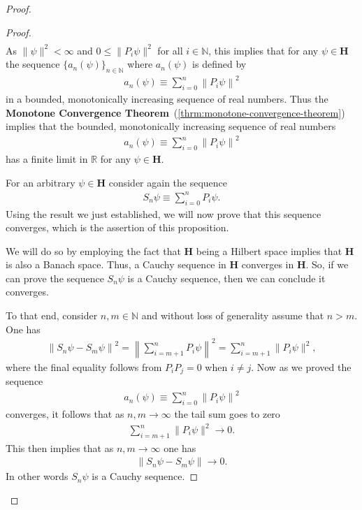 \begin{proof}
\begin{proof}
\begin{align}
\end{align}
As $\|\psi\|^2 < \infty$ and $0 \le \|P_i\psi\|^2$ for all $i \in \mathbb{N}$, this implies that for any $\psi \in \mathbf{H}$ the sequence $\{ a_n(\psi) \}_{n \in \mathbb{N}}$ where $a_n(\psi)$ is defined by
\begin{align}
    a_n(\psi) \equiv \sum_{i = 0}^n \left\| P_i\psi \right\|^2
\end{align}
in a bounded, monotonically increasing sequence of real numbers. Thus the \textbf{Monotone Convergence Theorem}~(\ref{thrm:monotone-convergence-theorem}) implies that the bounded, monotonically increasing sequence of real numbers
\begin{align}
    a_n(\psi) \equiv \sum_{i = 0}^n \left\| P_i\psi \right\|^2
\end{align}
has a finite limit in $\mathbb{R}$ for any $\psi \in \mathbf{H}$.

For an arbitrary $\psi \in \mathbf{H}$ consider again the sequence 
\begin{align}
    S_n\psi \equiv \sum_{i = 0}^n P_i\psi.
\end{align}
Using the result we just established, we will now prove that this sequence converges, which is the assertion of this proposition.

We will do so by employing the fact that $\mathbf{H}$ being a Hilbert space implies that $\mathbf{H}$ is also a Banach space. Thus, a Cauchy sequence in $\mathbf{H}$ converges in $\mathbf{H}$. So, if we can prove the sequence $S_n\psi$ is a Cauchy sequence, then we can conclude it converges.

To that end, consider $n, m \in \mathbb{N}$ and without loss of generality assume that $n > m$. One has
\begin{align}
    \left\| S_n\psi - S_m \psi \right\|^2 = \left\| \sum_{i=m+1}^n P_i\psi \right\|^2 = \sum_{i = m+1}^n \|P_i\psi\|^2,
\end{align}
where the final equality follows from $P_iP_j = 0$ when $i \neq j$. Now as we proved the sequence
\begin{align}
    a_n(\psi) \equiv \sum_{i = 0}^n \left\| P_i\psi \right\|^2
\end{align}
converges, it follows that as $n,m \rightarrow \infty$ the tail sum goes to zero
\begin{align}
    \sum_{i = m+1}^n \|P_i\psi\|^2 \rightarrow 0.
\end{align}
This then implies that as $n,m \rightarrow \infty$ one has
\begin{align}
    \left\| S_n\psi - S_m \psi \right\| \rightarrow 0.
\end{align}
In other words $S_n\psi$ is a Cauchy sequence.


\end{proof}
\end{proof}
